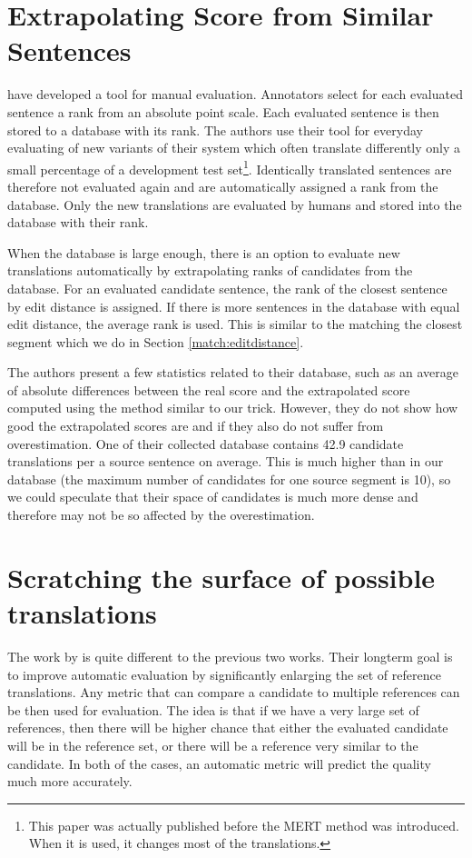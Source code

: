 \section{Extrapolating Score from Similar Sentences}

 have developed a tool for manual evaluation.
Annotators select for each evaluated sentence a rank from an absolute point
scale. Each evaluated sentence is then stored to a database with its rank. The
authors use their tool for everyday evaluating of new variants of their system
which often translate differently only a small percentage of a development test
set\footnote{This paper was actually published before the MERT method was
introduced.  When it is used, it changes most of the translations.}.
Identically translated sentences are therefore not evaluated again and are
automatically assigned a rank from the database. Only the new translations are
evaluated by humans and stored into the database with their rank.

When the database is large enough, there is an option to evaluate new
translations automatically by extrapolating ranks of candidates from the
database.  For an evaluated candidate sentence, the rank of the closest
sentence by edit distance is assigned. If there is more sentences in the
database with equal edit distance, the average rank is used. This is similar to
the matching the closest segment which we do in Section
\ref{match:editdistance}.

The authors present a few statistics related to their database, such as an
average of absolute differences between the real score and the extrapolated
score computed using the method similar to our  trick.
However, they do not show how good the extrapolated scores are and if they also
do not suffer from overestimation. One of their collected database contains
42.9 candidate translations per a source sentence on average. This is much
higher than in our database (the maximum number of candidates for one source
segment is 10), so we could speculate that their space of candidates is much
more dense and therefore may not be so affected by the overestimation.

\section{Scratching the surface of possible translations}

The work by  is quite different to the previous
two works. Their longterm goal is to improve automatic evaluation by
significantly enlarging the set of reference translations. Any metric that can
compare a candidate to multiple references can be then used for evaluation. The
idea is that if we have a very large set of references, then there will be higher
chance that either the evaluated candidate will be in the reference set, or
there will be a reference very similar to the candidate. In both of the cases,
an automatic metric will predict the quality much more accurately. 

